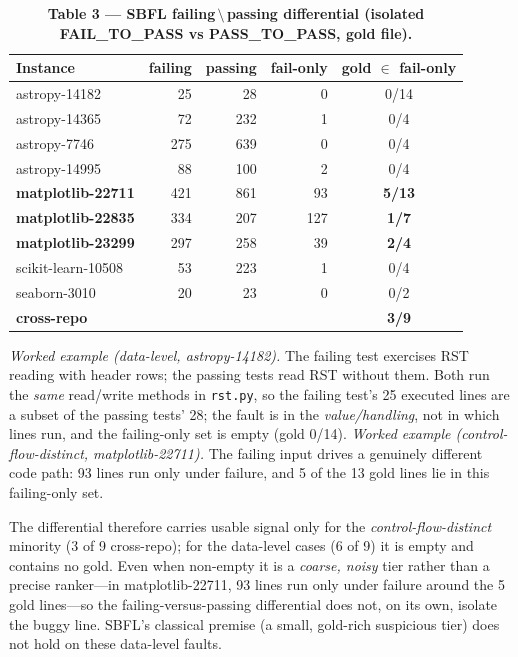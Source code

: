 \documentclass[11pt]{article}
\newcommand{\code}[1]{\texttt{#1}}
\begin{document}
\begin{table}[t]
\centering\small
\caption*{\textbf{Table 3 --- SBFL failing\,$\setminus$\,passing differential (isolated FAIL\_TO\_PASS vs PASS\_TO\_PASS, gold file).}}
\setlength{\tabcolsep}{7pt}
\begin{tabular}{lrrrc}
\toprule
Instance & failing & passing & fail-only & gold $\in$ fail-only \\
\midrule
astropy-14182 & 25 & 28 & 0 & 0/14 \\
astropy-14365 & 72 & 232 & 1 & 0/4 \\
astropy-7746 & 275 & 639 & 0 & 0/4 \\
astropy-14995 & 88 & 100 & 2 & 0/4 \\
\textbf{matplotlib-22711} & 421 & 861 & 93 & \textbf{5/13} \\
\textbf{matplotlib-22835} & 334 & 207 & 127 & \textbf{1/7} \\
\textbf{matplotlib-23299} & 297 & 258 & 39 & \textbf{2/4} \\
scikit-learn-10508 & 53 & 223 & 1 & 0/4 \\
seaborn-3010 & 20 & 23 & 0 & 0/2 \\
\midrule
\textbf{cross-repo} & & & & \textbf{3/9} \\
\bottomrule
\end{tabular}
\end{table}

\emph{Worked example (data-level, astropy-14182).} The failing test exercises RST reading with header rows; the passing tests read RST without them. Both run the \emph{same} read/write methods in \code{rst.py}, so the failing test's 25 executed lines are a subset of the passing tests' 28; the fault is in the \emph{value/handling}, not in which lines run, and the failing-only set is empty (gold 0/14). \emph{Worked example (control-flow-distinct, matplotlib-22711).} The failing input drives a genuinely different code path: 93 lines run only under failure, and 5 of the 13 gold lines lie in this failing-only set.

\smallskip\noindent The differential therefore carries usable signal only for the \emph{control-flow-distinct} minority (3 of 9 cross-repo); for the data-level cases (6 of 9) it is empty and contains no gold. Even when non-empty it is a \emph{coarse, noisy} tier rather than a precise ranker---in matplotlib-22711, 93 lines run only under failure around the 5 gold lines---so the failing-versus-passing differential does not, on its own, isolate the buggy line. SBFL's classical premise (a small, gold-rich suspicious tier) does not hold on these data-level faults.
\end{document}
